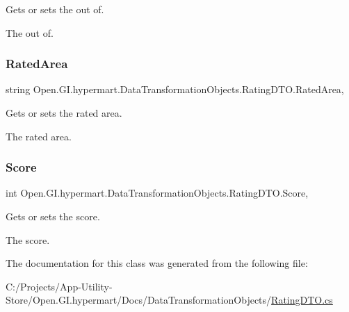 Gets or sets the out of. 

The out of. \hypertarget{class_open_1_1_g_i_1_1hypermart_1_1_data_transformation_objects_1_1_rating_d_t_o_ad3282fe707334d675bc3c99694dff533}{}\label{class_open_1_1_g_i_1_1hypermart_1_1_data_transformation_objects_1_1_rating_d_t_o_ad3282fe707334d675bc3c99694dff533} 
\subsubsection{\texorpdfstring{Rated\+Area}{RatedArea}}
{\footnotesize\ttfamily string Open.\+G\+I.\+hypermart.\+Data\+Transformation\+Objects.\+Rating\+D\+T\+O.\+Rated\+Area\hspace{0.3cm}{\ttfamily [get]}, {\ttfamily [set]}}



Gets or sets the rated area. 

The rated area. \hypertarget{class_open_1_1_g_i_1_1hypermart_1_1_data_transformation_objects_1_1_rating_d_t_o_a8548920a2914900206fe636ca7aa7cbb}{}\label{class_open_1_1_g_i_1_1hypermart_1_1_data_transformation_objects_1_1_rating_d_t_o_a8548920a2914900206fe636ca7aa7cbb} 
\subsubsection{\texorpdfstring{Score}{Score}}
{\footnotesize\ttfamily int Open.\+G\+I.\+hypermart.\+Data\+Transformation\+Objects.\+Rating\+D\+T\+O.\+Score\hspace{0.3cm}{\ttfamily [get]}, {\ttfamily [set]}}



Gets or sets the score. 

The score. 

The documentation for this class was generated from the following file\+:\begin{DoxyCompactItemize}
\item 
C\+:/\+Projects/\+App-\/\+Utility-\/\+Store/\+Open.\+G\+I.\+hypermart/\+Docs/\+Data\+Transformation\+Objects/\hyperlink{_rating_d_t_o_8cs}{Rating\+D\+T\+O.\+cs}\end{DoxyCompactItemize}
